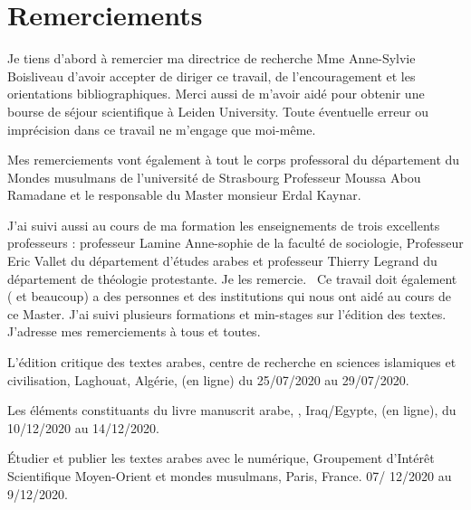 \documentclass[a4paper,12pt]{report}
\begin{document}
\newpage
\thispagestyle{empty}
\mbox{}
\newpage

\tableofcontents
{}
\thispagestyle{empty}

\newpage
\thispagestyle{empty}
\listoffigures
   \thispagestyle{empty}  

\newpage
{}
\setcounter{page}{1}

\normalsize

\chapter*{Remerciements }

\thispagestyle{empty}

Je tiens d'abord à remercier ma directrice de recherche Mme Anne-Sylvie Boisliveau d'avoir accepter de diriger ce travail, de l'encouragement et les orientations bibliographiques. Merci aussi de m'avoir aidé pour obtenir une bourse  de séjour scientifique à Leiden University.  Toute éventuelle erreur ou imprécision dans ce travail  ne m'engage que moi-même. 

Mes remerciements vont également à tout le corps professoral du département du Mondes musulmans de l'université de Strasbourg Professeur Moussa Abou Ramadane et le responsable du Master monsieur Erdal Kaynar. \

 J'ai suivi aussi au cours de ma formation les enseignements de trois excellents professeurs :  professeur  Lamine Anne-sophie   de la faculté de sociologie,  Professeur Eric Vallet du département d'études arabes et   professeur Thierry Legrand du département de théologie protestante. Je les remercie.     
\
Ce travail doit également ( et beaucoup) a des personnes et des institutions qui nous ont aidé au cours de ce Master. J'ai suivi  plusieurs  formations et min-stages sur l'édition des textes. J'adresse mes remerciements à tous et toutes. 

  L’édition critique des textes arabes, centre de recherche en sciences islamiques et civilisation,  Laghouat, Algérie, (en ligne) du 25/07/2020 au 29/07/2020.   

  Les éléments constituants du livre manuscrit arabe,   , Iraq/Egypte, (en ligne), 	du 10/12/2020 au 14/12/2020.

   Étudier et publier les textes arabes avec le numérique, Groupement d’Intérêt Scientifique Moyen-Orient et mondes musulmans, Paris, France. 07/ 12/2020 au 9/12/2020.
\end{document}
